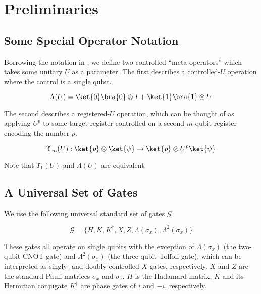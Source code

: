 \section{Preliminaries}
\label{sec:prelims}

\subsection{Some Special Operator Notation}

Borrowing the notation in \cite{ksv02},
we define two controlled ``meta-operators'' which takes some unitary $U$ as
a parameter. The first describes a controlled-$U$ operation where the control
is a single qubit.

\begin{displaymath}
\Lambda(U) = \ket{0}\bra{0} \otimes I + \ket{1}\bra{1} \otimes U
\end{displaymath}

The second describes a registered-$U$ operation, which
can be thought of as applying $U^p$ to some target register
controlled on a second $m$-qubit register
encoding the number $p$.

\begin{displaymath}
\Upsilon_m(U) : \ket{p} \otimes \ket{\psi} \rightarrow \ket{p}
\otimes U^p\ket{\psi}
\end{displaymath}

Note that $\Upsilon_1(U)$ and $\Lambda(U)$ are equivalent.

\subsection{A Universal Set of Gates}

We use the following universal standard set of gates $\mathcal{G}$.

\begin{displaymath}
\mathcal{G} = \{ H, K, K^{\dagger}, X, Z,
\Lambda(\sigma_x), \Lambda^2(\sigma_x) \}
\end{displaymath}

These gates all operate on single qubits with the
exception of $\Lambda(\sigma_x)$ (the two-qubit CNOT gate)
and $\Lambda^2(\sigma_x)$ (the three-qubit Toffoli gate),
which can be interpreted as singly- and doubly-controlled
$X$ gates, respectively. $X$ and $Z$ are the standard Pauli matrices
$\sigma_x$ and $\sigma_z$, $H$ is the Hadamard matrix, $K$ and its
Hermitian conjugate $K^{\dagger}$ are phase gates of $i$ and $-i$,
respectively.

